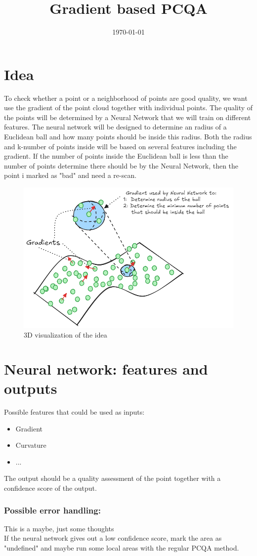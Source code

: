 \documentclass{article}
\title{Gradient based PCQA}
\date{\today}
\begin{document}
\maketitle


\section{Idea}

To check whether a point or a neighborhood of points are good quality, we want use the gradient of the point cloud together with individual points. The quality of the points will be determined by a Neural Network that we will train on different features. The neural network will be designed to determine an radius of a Euclidean ball and how many points should be inside this radius. Both the radius and k-number of points inside will be based on several features including the gradient. If the number of points inside the Euclidean ball is less than the number of points determine there should be by the Neural Network, then the point i marked as "bad" and need a re-scan.
\begin{figure}[h]
    \centering
    \includegraphics[width=0.8\linewidth]{Idea3D.png}
    \caption{3D visualization of the idea}
    \label{fig:3didea}
\end{figure}



\section{Neural network: features and outputs}
Possible features that could be used as inputs:
\begin{itemize}
    \item Gradient
    \item Curvature 
    \item ...
\end{itemize}

The output should be a quality assessment of the point together with a confidence score of the output.




\subsubsection*{Possible error handling:}
This is a maybe, just some thoughts\\
If the neural network gives out a low confidence score, mark the area as "undefined" and maybe run some local areas with the regular PCQA method.
\end{document}
